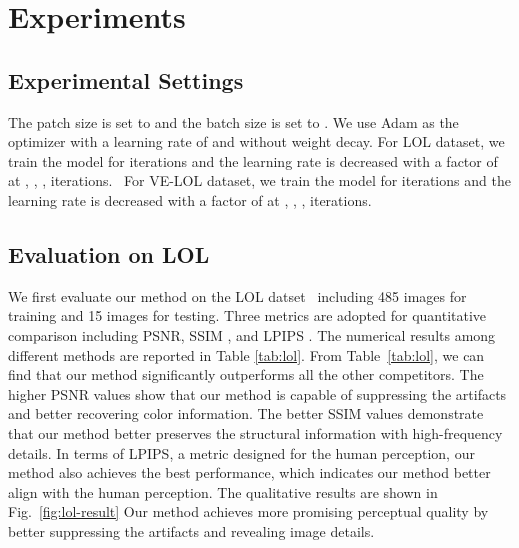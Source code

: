 \documentclass[letterpaper]{article} \usepackage{aaai22}  \usepackage{times}  \usepackage{helvet}  \usepackage{courier}  \usepackage[hyphens]{url}  \usepackage{graphicx} \urlstyle{rm} \def\UrlFont{\rm}  \usepackage{natbib}  \usepackage{caption} \usepackage{subfigure}
\newcommand{\Tref}[1]{Table~\ref{#1}}
\newcommand{\Fref}[1]{Fig.~\ref{#1}}
\newcommand{\yufei}[1]{{#1}}
\newcommand{\wh}[1]{{#1}}
\begin{document}
\section{Experiments}

\wh{\subsection{Experimental Settings}}
The patch size is set to  and the batch size is set to . 
We use Adam as the optimizer with a learning rate of  and without weight decay. 
\yufei{For LOL dataset}, we train the model for  iterations and the learning rate is decreased with a factor of  at , , ,  iterations. \
\yufei{For VE-LOL dataset, we train the model for  iterations and the learning rate is decreased with a factor of  at , , ,  iterations.}


\wh{\subsection{Evaluation on LOL}} 
\yufei{We first evaluate our method on the LOL datset~\cite{wei2018deep} \wh{including} 485 images for training and 15 images for testing.}
Three metrics are adopted for quantitative comparison including PSNR, SSIM \cite{wang2004image}, and LPIPS \cite{zhang2018unreasonable}. 
The numerical results among different methods are reported in Table \ref{tab:lol}. 
From \Tref{tab:lol}, we can find that our method significantly outperforms all the other competitors. 
The higher PSNR values \wh{show} that our method is capable of suppressing the artifacts and better recovering color information.
The better SSIM values demonstrate that our method better preserves the structural information with high-frequency details. 
In terms of LPIPS, a metric designed for the human perception, our method also \wh{achieves} the best performance, which indicates our method \wh{better align with} the human perception. 
\wh{The qualitative results are shown in \Fref{fig:lol-result}}
Our method achieves more promising perceptual quality by better suppressing the artifacts and \wh{revealing} image details.
\end{document}
